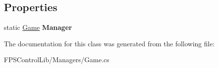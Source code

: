 \subsection*{Properties}
\begin{DoxyCompactItemize}
\item 
\hypertarget{class_f_p_s_control_1_1_game_ab04d23bf74ba9ed685683d8a92b5151a}{static \hyperlink{class_f_p_s_control_1_1_game}{Game} {\bfseries Manager}}\label{class_f_p_s_control_1_1_game_ab04d23bf74ba9ed685683d8a92b5151a}

\end{DoxyCompactItemize}


The documentation for this class was generated from the following file\-:\begin{DoxyCompactItemize}
\item 
F\-P\-S\-Control\-Lib/\-Managers/Game.\-cs\end{DoxyCompactItemize}
